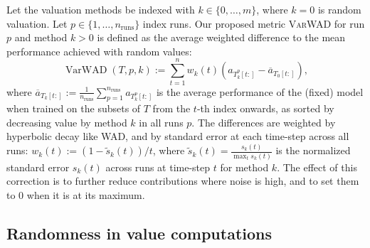 \documentclass[10pt]{article}
\newcommand{\assign}{:=}
\newcommand{\tmname}[1]{\textsc{#1}}
\newcommand{\tmop}[1]{\ensuremath{\operatorname{#1}}}
\begin{document}
Let the valuation methods be indexed with $k \in \{ 0, \ldots, m \}$, where $k
= 0$ is random valuation. Let $p \in \{ 1, \ldots, n_{\tmop{runs}} \}$ index
runs. Our proposed metric {\tmname{VarWAD}} for run $p$ and method $k > 0$ is
defined as the average weighted difference to the mean performance achieved
with random values:
\begin{equation}
  \tmop{VarWAD} (T, p, k) \assign \sum_{t = 1}^n w_k (t)  (a_{T^p_k [t :]} -
  \overline{a}_{T_0 [t :]}), \label{eq:varwad}
\end{equation}
where $\overline{a}_{T_k [t :]} \assign \frac{1}{n_{\tmop{runs}}}  \sum_{p =
1}^{n_{\tmop{runs}}} a_{T_k^p [t :]}$ is the average performance of the
(fixed) model when trained on the subsets of $T$ from the $t$-th index
onwards, as sorted by decreasing value by method $k$ in all runs $p$. The
differences are weighted by hyperbolic decay like WAD, and by standard error
at each time-step across all runs: $w_k (t) \assign (1 - \tilde{s}_k (t)) /
t$, where $\tilde{s}_k (t) = \frac{s_k (t)}{\max_t s_k (t)}$ is the normalized
standard error $s_k (t)$ across runs at time-step $t$ for method $k$. The
effect of this correction is to further reduce contributions where noise is
high, and to set them to 0 when it is at its maximum.

\subsection{Randomness in value computations}\label{sec:sources-of-randomness}
\end{document}
